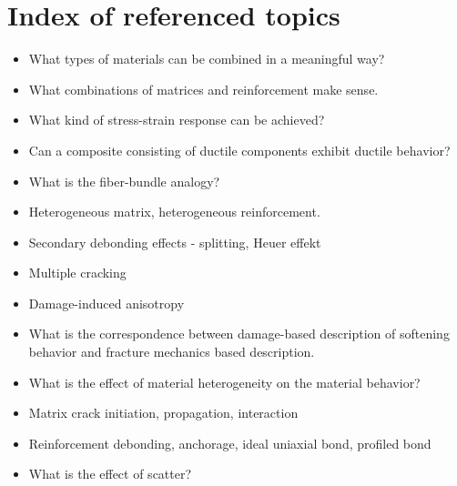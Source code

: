 \documentclass[main.tex]{subfiles}
\begin{document}
\section{Index of referenced topics}

\begin{itemize}
\item What types of materials can be combined in a meaningful way?
 \item What combinations of matrices and reinforcement make sense.
 \item What kind of stress-strain response can be achieved?
 \item Can a composite consisting of ductile components exhibit ductile behavior?
 \item What is the fiber-bundle analogy?
 \item Heterogeneous matrix, heterogeneous reinforcement.
\item Secondary debonding effects - splitting, Heuer effekt
\item Multiple cracking
\item Damage-induced anisotropy
\item What is the correspondence between damage-based description of softening behavior and fracture mechanics based description.
\item What is the effect of material heterogeneity on the material behavior?
\item Matrix crack initiation, propagation, interaction
\item Reinforcement debonding, anchorage, ideal uniaxial bond, profiled bond
\item{What is the effect of scatter?}
\end{itemize}
\end{document}
